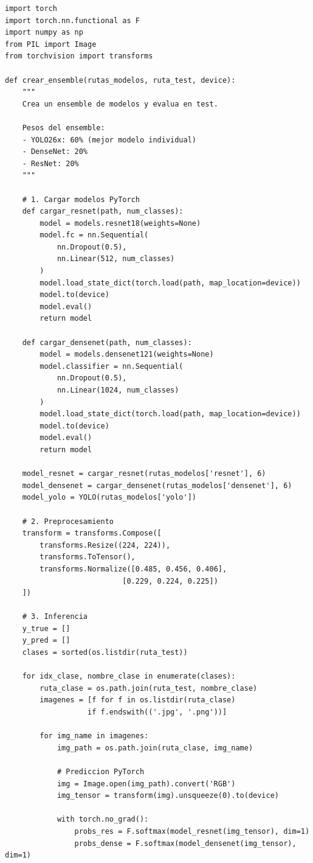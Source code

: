 \documentclass[12pt,a4paper]{article}
\begin{document}
\begin{lstlisting}[caption={Implementación completa del ensemble}]
import torch
import torch.nn.functional as F
import numpy as np
from PIL import Image
from torchvision import transforms

def crear_ensemble(rutas_modelos, ruta_test, device):
    """
    Crea un ensemble de modelos y evalua en test.

    Pesos del ensemble:
    - YOLO26x: 60% (mejor modelo individual)
    - DenseNet: 20%
    - ResNet: 20%
    """

    # 1. Cargar modelos PyTorch
    def cargar_resnet(path, num_classes):
        model = models.resnet18(weights=None)
        model.fc = nn.Sequential(
            nn.Dropout(0.5),
            nn.Linear(512, num_classes)
        )
        model.load_state_dict(torch.load(path, map_location=device))
        model.to(device)
        model.eval()
        return model

    def cargar_densenet(path, num_classes):
        model = models.densenet121(weights=None)
        model.classifier = nn.Sequential(
            nn.Dropout(0.5),
            nn.Linear(1024, num_classes)
        )
        model.load_state_dict(torch.load(path, map_location=device))
        model.to(device)
        model.eval()
        return model

    model_resnet = cargar_resnet(rutas_modelos['resnet'], 6)
    model_densenet = cargar_densenet(rutas_modelos['densenet'], 6)
    model_yolo = YOLO(rutas_modelos['yolo'])

    # 2. Preprocesamiento
    transform = transforms.Compose([
        transforms.Resize((224, 224)),
        transforms.ToTensor(),
        transforms.Normalize([0.485, 0.456, 0.406],
                           [0.229, 0.224, 0.225])
    ])

    # 3. Inferencia
    y_true = []
    y_pred = []
    clases = sorted(os.listdir(ruta_test))

    for idx_clase, nombre_clase in enumerate(clases):
        ruta_clase = os.path.join(ruta_test, nombre_clase)
        imagenes = [f for f in os.listdir(ruta_clase)
                   if f.endswith(('.jpg', '.png'))]

        for img_name in imagenes:
            img_path = os.path.join(ruta_clase, img_name)

            # Prediccion PyTorch
            img = Image.open(img_path).convert('RGB')
            img_tensor = transform(img).unsqueeze(0).to(device)

            with torch.no_grad():
                probs_res = F.softmax(model_resnet(img_tensor), dim=1)
                probs_dense = F.softmax(model_densenet(img_tensor), dim=1)


\end{lstlisting}
\end{document}
